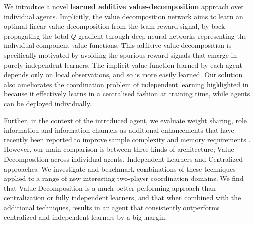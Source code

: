 \documentclass{article}
\begin{document}

We introduce a novel {\bf learned additive value-decomposition} approach over individual agents. %
Implicitly, the value decomposition network aims to learn an optimal linear value decomposition from the team reward signal, by back-propagating the total $Q$ gradient through deep neural networks representing the individual component value functions. %
This additive value decomposition is specifically motivated by avoiding the spurious reward signals that emerge in purely independent learners.%
The implicit value function learned by each agent depends only on local observations, and so is more easily learned. %
Our solution also ameliorates the coordination problem of independent learning highlighted in \citet{ClausBoutillierDynamics} because it effectively learns in a centralised fashion at training time, while agents can be deployed individually. 

Further, in the context of the introduced agent, we evaluate weight sharing, role information and information channels as additional enhancements that have recently been reported to improve sample complexity and memory requirements \citep{HausknechtThesis,FoersterCommunicate, SF16}. However, our main comparison is between three kinds of architecture; Value-Decomposition across individual agents, Independent Learners and Centralized approaches. We investigate and benchmark combinations of these techniques applied to a range of new interesting two-player coordination domains. We find that Value-Decomposition is a much better performing approach than centralization or fully independent learners, and that when combined with the additional techniques, results in an agent that consistently outperforms centralized and independent learners by a big margin.
\end{document}

